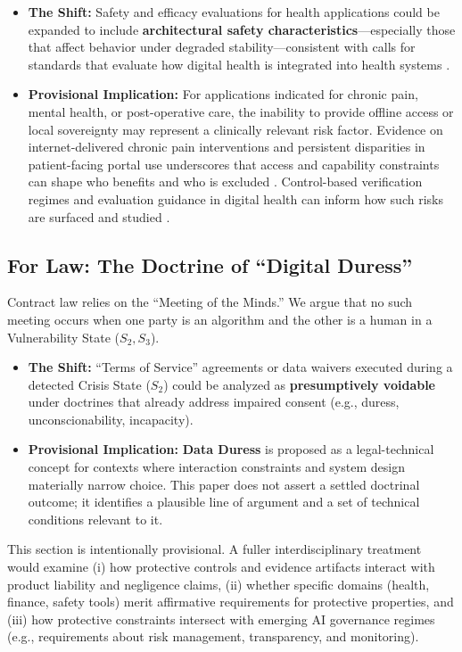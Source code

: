 \documentclass[12pt]{article}
\begin{document}
\begin{itemize}
\item \textbf{The Shift:} Safety and efficacy evaluations for health applications could be expanded to include \textbf{architectural safety characteristics}---especially those that affect behavior under degraded stability---consistent with calls for standards that evaluate how digital health is integrated into health systems \cite{labrique2018digitalhealthstandards}.
\item \textbf{Provisional Implication:} For applications indicated for chronic pain, mental health, or post-operative care, the inability to provide offline access or local sovereignty may represent a clinically relevant risk factor. Evidence on internet-delivered chronic pain interventions and persistent disparities in patient-facing portal use underscores that access and capability constraints can shape who benefits and who is excluded \cite{eccleston2014internetdelivered,buhrman2016internetinterventions,sarkar2011patientportal}. Control-based verification regimes and evaluation guidance in digital health can inform how such risks are surfaced and studied \cite{who2019digitalinterventions}.
\end{itemize}

\subsection{For Law: The Doctrine of ``Digital Duress''}
Contract law relies on the ``Meeting of the Minds.'' We argue that no such meeting occurs when one party is an algorithm and the other is a human in a Vulnerability State ($S_2, S_3$).

\begin{itemize}
\item \textbf{The Shift:} ``Terms of Service'' agreements or data waivers executed during a detected Crisis State ($S_2$) could be analyzed as \textbf{presumptively voidable} under doctrines that already address impaired consent (e.g., duress, unconscionability, incapacity).
\item \textbf{Provisional Implication:} \textbf{Data Duress} is proposed as a legal-technical concept for contexts where interaction constraints and system design materially narrow choice. This paper does not assert a settled doctrinal outcome; it identifies a plausible line of argument and a set of technical conditions relevant to it.
\end{itemize}

This section is intentionally provisional. A fuller interdisciplinary treatment would examine (i) how protective controls and evidence artifacts interact with product liability and negligence claims, (ii) whether specific domains (health, finance, safety tools) merit affirmative requirements for protective properties, and (iii) how protective constraints intersect with emerging AI governance regimes (e.g., requirements about risk management, transparency, and monitoring).
\end{document}
